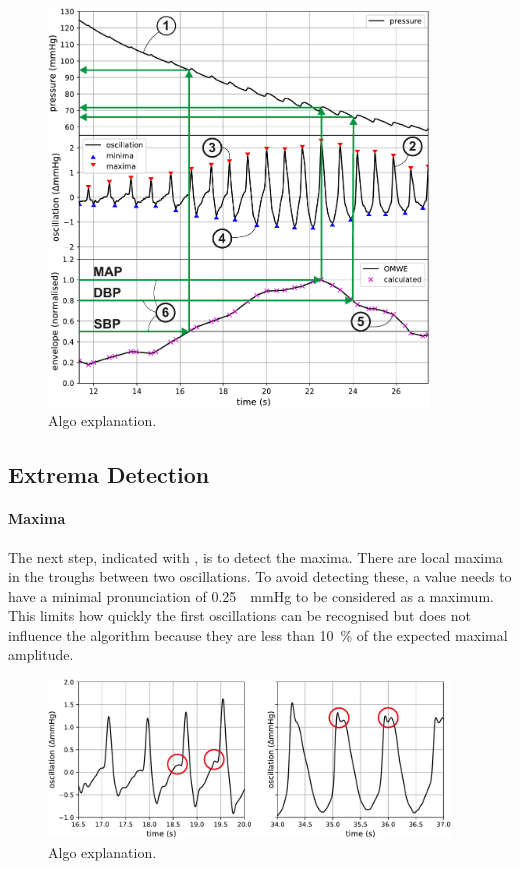 \begin{figure}[ht]
\centering
\includegraphics[width=0.9\textwidth]{figures/algorithm_example_annotated.pdf}
\caption{Algo explanation.}
\label{fig:algoExplain}
\end{figure}



\subsection{Extrema Detection}
\paragraph{Maxima} The next step, indicated with , is to detect the maxima. There are local maxima in the troughs between two oscillations. To avoid detecting these, a value needs to have a minimal pronunciation of \SI{0.25}{\Delta\mmHg} to be considered as a maximum. This limits how quickly the first oscillations can be recognised but does not influence the algorithm because they are less than \SI{10}{\percent} of the expected maximal amplitude.


\begin{figure}[ht]
\centering
\includegraphics[width=0.95\textwidth]{figures/maxima_issue.pdf}
\caption{Algo explanation.}
\label{fig:maxDetectIssue}
\end{figure}



